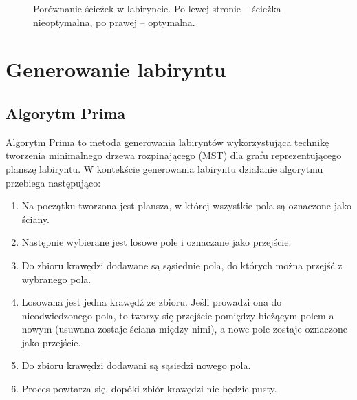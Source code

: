 \documentclass[12pt, a4paper]{article}
\begin{document}
\begin{figure}[ht]
\begin{minipage}{0.45\textwidth}
  \end{minipage}
  \caption{\centering Porównanie ścieżek w labiryncie. Po lewej stronie – ścieżka nieoptymalna, po prawej – optymalna.}
  \label{fig:labirynt_optymalna_i_nieoptymalna_sciezka}
\end{figure}

\newcommand{\GridWidth}{8}   %
\newcommand{\GridHeight}{6}  %

\section{Generowanie labiryntu}

\subsection{Algorytm Prima}

Algorytm Prima to metoda generowania labiryntów wykorzystująca technikę tworzenia minimalnego drzewa rozpinającego (MST) dla grafu reprezentującego planszę labiryntu.
W kontekście generowania labiryntu działanie algorytmu przebiega następująco:

\begin{enumerate}
    \item Na początku tworzona jest plansza, w której wszystkie pola są oznaczone jako ściany.
    \item Następnie wybierane jest losowe pole i oznaczane jako przejście.
    \item Do zbioru krawędzi dodawane są sąsiednie pola, do których można przejść z wybranego pola.
    \item Losowana jest jedna krawędź ze zbioru. Jeśli prowadzi ona do nieodwiedzonego pola, to tworzy się przejście pomiędzy bieżącym polem a nowym (usuwana zostaje ściana między nimi), a nowe pole zostaje oznaczone jako przejście.
    \item Do zbioru krawędzi dodawani są sąsiedzi nowego pola. 
    \item Proces powtarza się, dopóki zbiór krawędzi nie będzie pusty.
\end{enumerate}
\end{document}
